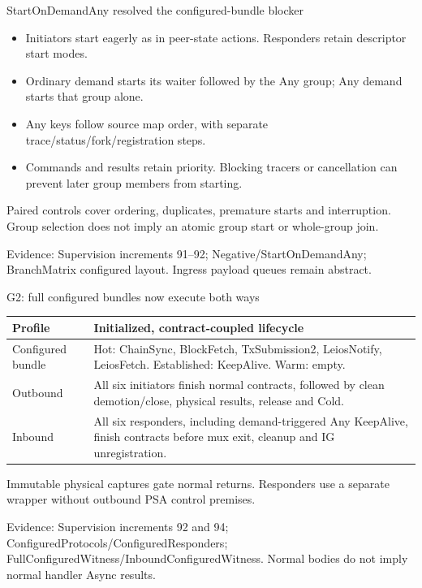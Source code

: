 \documentclass[11pt,aspectratio=169]{beamer}
\newcommand{\evidence}[1]{\vfill{\fontsize{7}{8}\selectfont\color{Muted}Evidence: #1\par}}
\begin{document}
\begin{frame}{StartOnDemandAny resolved the configured-bundle blocker}
\begin{itemize}\setlength\itemsep{2.5mm}
\item Initiators start eagerly as in peer-state actions. Responders retain descriptor start modes.
\item Ordinary demand starts its waiter followed by the Any group; Any demand starts that group alone.
\item Any keys follow source map order, with separate trace/status/fork/registration steps.
\item Commands and results retain priority. Blocking tracers or cancellation can prevent later group members from starting.
\end{itemize}\small Paired controls cover ordering, duplicates, premature starts and interruption. Group selection does not imply an atomic group start or whole-group join.
\evidence{Supervision increments 91--92; Negative/StartOnDemandAny; BranchMatrix configured layout. Ingress payload queues remain abstract.}
\end{frame}

\begin{frame}{G2: full configured bundles now execute both ways}
\small\renewcommand{\arraystretch}{1.2}
\begin{tabularx}{\textwidth}{@{}P{28mm}Y@{}}
\toprule
Profile & Initialized, contract-coupled lifecycle \\ \midrule
Configured bundle & Hot: ChainSync, BlockFetch, TxSubmission2, LeiosNotify, LeiosFetch. Established: KeepAlive. Warm: empty. \\[2mm]
Outbound & All six initiators finish normal contracts, followed by clean demotion/close, physical results, release and Cold. \\[2mm]
Inbound & All six responders, including demand-triggered Any KeepAlive, finish contracts before mux exit, cleanup and IG unregistration. \\[2mm]
\bottomrule
\end{tabularx}\par\vspace{2mm}\small Immutable physical captures gate normal returns. Responders use a separate wrapper without outbound PSA control premises.
\evidence{Supervision increments 92 and 94; ConfiguredProtocols/ConfiguredResponders; FullConfiguredWitness/InboundConfiguredWitness. Normal bodies do not imply normal handler Async results.}
\end{frame}
\end{document}
